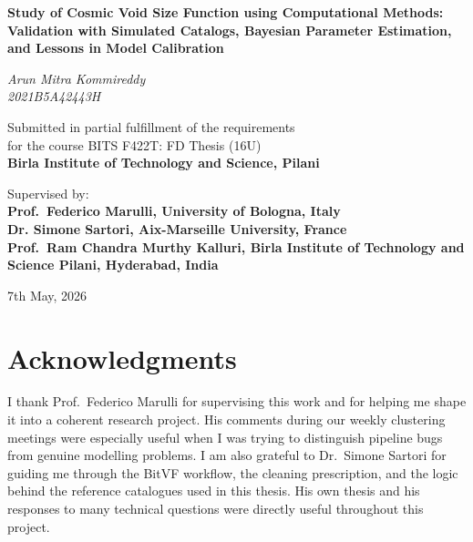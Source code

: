 \documentclass[12pt]{report}
\begin{document}
\hypersetup{pageanchor=false}

\begin{titlepage}
    \centering
    \vspace*{2cm}
    {\Large\bfseries Study of Cosmic Void Size Function using Computational Methods:\\[6pt]
    Validation with Simulated Catalogs, Bayesian Parameter Estimation,\\[4pt]
    and Lessons in Model Calibration\par}
    \vspace{1.5cm}
    {\Large\itshape Arun Mitra Kommireddy\\ 2021B5A42443H \par}
    \vfill
    {\large Submitted in partial fulfillment of the requirements\\
    for the course BITS F422T: FD Thesis (16U)\\[6pt]
    \bfseries Birla Institute of Technology and Science, Pilani\par}
    \vspace{1cm}
    {\large Supervised by:\\\bfseries Prof.\ Federico Marulli, University of Bologna, Italy\\ Dr. Simone Sartori, Aix-Marseille University, France\\ Prof.\ Ram Chandra Murthy Kalluri, Birla Institute of Technology and Science Pilani, Hyderabad, India\par}
    \vfill
    {\large 7th May, 2026\par}
\end{titlepage}

\chapter*{Acknowledgments}

I thank Prof.\ Federico Marulli for supervising this work and for helping me shape it into a coherent research project. His comments during our weekly clustering meetings were especially useful when I was trying to distinguish pipeline bugs from genuine modelling problems. I am also grateful to Dr.\ Simone Sartori for guiding me through the BitVF workflow, the cleaning prescription, and the logic behind the reference catalogues used in this thesis. His own thesis and his responses to many technical questions were directly useful throughout this project.
\end{document}
